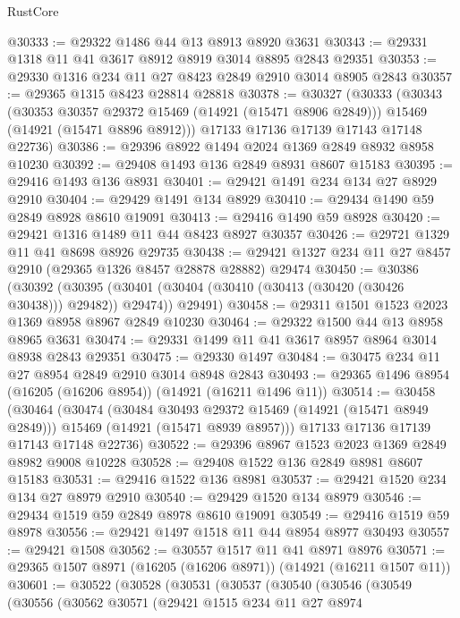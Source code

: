 \begin{lexlean}{RustCore}
\begin{coremodule}
@30333 := @29322 @1486 @44 @13 @8913 @8920 @3631
@30343 := @29331 @1318 @11 @41 @3617 @8912 @8919 @3014 @8895 @2843 @29351
@30353 := @29330 @1316 @234 @11 @27 @8423 @2849 @2910 @3014 @8905 @2843
@30357 := @29365 @1315 @8423 @28814 @28818
@30378 := @30327
    (@30333
      (@30343
        (@30353 @30357 @29372 @15469 (@14921 (@15471 @8906 @2849)))
        @15469
        (@14921 (@15471 @8896 @8912)))
      @17133
      @17136
      @17139
      @17143
      @17148
      @22736)
@30386 := @29396 @8922 @1494 @2024 @1369 @2849 @8932 @8958 @10230
@30392 := @29408 @1493 @136 @2849 @8931 @8607 @15183
@30395 := @29416 @1493 @136 @8931
@30401 := @29421 @1491 @234 @134 @27 @8929 @2910
@30404 := @29429 @1491 @134 @8929
@30410 := @29434 @1490 @59 @2849 @8928 @8610 @19091
@30413 := @29416 @1490 @59 @8928
@30420 := @29421 @1316 @1489 @11 @44 @8423 @8927 @30357
@30426 := @29721 @1329 @11 @41 @8698 @8926 @29735
@30438 := @29421 @1327 @234 @11 @27 @8457 @2910 (@29365 @1326 @8457 @28878 @28882) @29474
@30450 := @30386
    (@30392
      (@30395 (@30401 (@30404 (@30410 (@30413 (@30420 (@30426 @30438))) @29482)) @29474))
      @29491)
@30458 := @29311 @1501 @1523 @2023 @1369 @8958 @8967 @2849 @10230
@30464 := @29322 @1500 @44 @13 @8958 @8965 @3631
@30474 := @29331 @1499 @11 @41 @3617 @8957 @8964 @3014 @8938 @2843 @29351
@30475 := @29330 @1497
@30484 := @30475 @234 @11 @27 @8954 @2849 @2910 @3014 @8948 @2843
@30493 := @29365 @1496 @8954 (@16205 (@16206 @8954)) (@14921 (@16211 @1496 @11))
@30514 := @30458
    (@30464
      (@30474
        (@30484 @30493 @29372 @15469 (@14921 (@15471 @8949 @2849)))
        @15469
        (@14921 (@15471 @8939 @8957)))
      @17133
      @17136
      @17139
      @17143
      @17148
      @22736)
@30522 := @29396 @8967 @1523 @2023 @1369 @2849 @8982 @9008 @10228
@30528 := @29408 @1522 @136 @2849 @8981 @8607 @15183
@30531 := @29416 @1522 @136 @8981
@30537 := @29421 @1520 @234 @134 @27 @8979 @2910
@30540 := @29429 @1520 @134 @8979
@30546 := @29434 @1519 @59 @2849 @8978 @8610 @19091
@30549 := @29416 @1519 @59 @8978
@30556 := @29421 @1497 @1518 @11 @44 @8954 @8977 @30493
@30557 := @29421 @1508
@30562 := @30557 @1517 @11 @41 @8971 @8976
@30571 := @29365 @1507 @8971 (@16205 (@16206 @8971)) (@14921 (@16211 @1507 @11))
@30601 := @30522
    (@30528
      (@30531
        (@30537
          (@30540
            (@30546
              (@30549
                (@30556
                  (@30562
                    @30571
                    (@29421
                      @1515
                      @234
                      @11
                      @27
                      @8974

\end{coremodule}
\end{lexlean}
